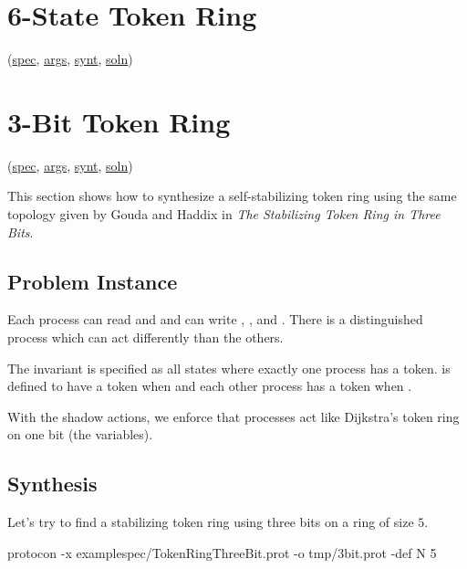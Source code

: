 \section{6-State Token Ring}
\label{sec:TokenRingSixState}

(\href{\examplespec/TokenRingSuperpos.prot}{spec},
\href{\examplesett/TokenRingSixState.args}{args},
\href{\examplesynt/TokenRingSixState.prot}{synt},
\href{\examplesoln/TokenRingSixState.prot}{soln})

\section{3-Bit Token Ring}
\label{sec:TokenRingThreeBit}

(\href{\examplespec/TokenRingThreeBit.prot}{spec},
\href{\examplesett/TokenRingThreeBit.args}{args},
\href{\examplesynt/TokenRingThreeBit.prot}{synt},
\href{\examplesoln/TokenRingThreeBit.prot}{soln})

This section shows how to synthesize a self-stabilizing token ring using the same topology given by
Gouda and Haddix in \textit{The Stabilizing Token Ring in Three Bits}.

\subsection{Problem Instance}


Each process can read  and  and can write , , and .
There is a distinguished process  which can act differently than the others.

The invariant is specified as all states where exactly one process has a token.
 is defined to have a token when  and each other  process has a token when .

With the shadow actions, we enforce that processes act like Dijkstra's token ring on one bit (the  variables).

\subsection{Synthesis}

Let's try to find a stabilizing token ring using three bits on a ring of size $5$.
\begin{code}
protocon -x examplespec/TokenRingThreeBit.prot -o tmp/3bit.prot -def N 5
\end{code}

